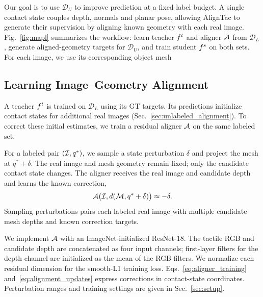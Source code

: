 Our goal is to use $\mathcal{D}_{U}$ to improve prediction at a fixed label budget. A single contact state couples depth, normals and planar pose, allowing AlignTac to generate their supervision by aligning known geometry with each real image. Fig.~\ref{fig:mapl} summarizes the workflow: learn teacher $f^{t}$ and aligner $\mathcal{A}$ from $\mathcal{D}_{L}$, generate aligned-geometry targets for $\mathcal{D}_{U}$, and train student $f^{s}$ on both sets. For each image, we use its corresponding object mesh 

\subsection{Learning Image--Geometry Alignment}
\label{sec:learn_alignment}
A teacher $f^{t}$ is trained on $\mathcal{D}_{L}$ using its GT targets. Its predictions initialize contact states for additional real images (Sec.~\ref{sec:unlabeled_alignment}). To correct these initial estimates, we train a residual aligner $\mathcal{A}$ on the same labeled set.

For a labeled pair $(\mathcal{I},q^\ast)$, we sample a state perturbation $\delta$ and project the mesh at $q^\ast+\delta$. The real image and mesh geometry remain fixed; only the candidate contact state changes. The aligner receives the real image and candidate depth and learns the known correction,
\begin{equation}
    \mathcal{A}\big(\mathcal{I},d(\mathcal{M},q^\ast+\delta)\big)\approx-\delta.
    \label{eq:aligner_training}
\end{equation}
Sampling perturbations pairs each labeled real image with multiple candidate mesh depths and known correction targets.

We implement $\mathcal{A}$ with an ImageNet-initialized ResNet-18. The tactile RGB and candidate depth are concatenated as four input channels; first-layer filters for the depth channel are initialized as the mean of the RGB filters. We normalize each residual dimension for the smooth-L1 training loss. Eqs.~\ref{eq:aligner_training} and~\ref{eq:alignment_updates} express corrections in contact-state coordinates. Perturbation ranges and training settings are given in Sec.~\ref{sec:setup}.


